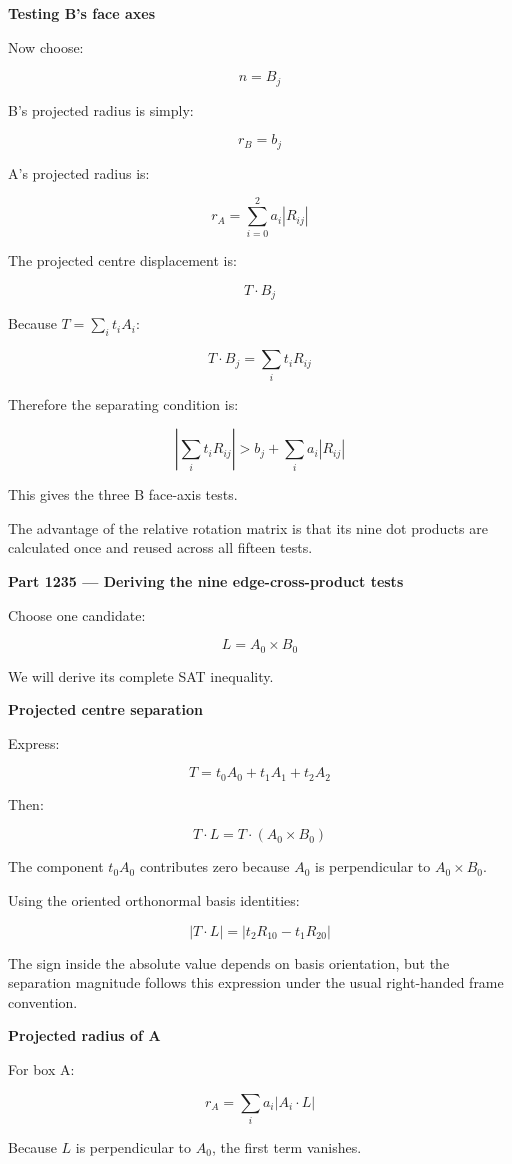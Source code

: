 \textbf{Testing B's face axes}

Now choose:

\[
n=B_j
\]

B's projected radius is simply:

\[
r_B=b_j
\]

A's projected radius is:

\[
r_A=\sum_{i=0}^2a_i|R_{ij}|
\]

The projected centre displacement is:

\[
T\cdot B_j
\]

Because \(T=\sum_i t_iA_i\):

\[
T\cdot B_j=\sum_i t_iR_{ij}
\]

Therefore the separating condition is:

\[
\boxed{ \left|\sum_i t_iR_{ij}\right| > b_j+\sum_i a_i|R_{ij}| }
\]

This gives the three B face-axis tests.

The advantage of the relative rotation matrix is that its nine dot products are calculated once and reused across all fifteen tests.

\textbf{Part 1235 --- Deriving the nine edge-cross-product tests}

Choose one candidate:

\[
\boxed{ L=A_0\times B_0 }
\]

We will derive its complete SAT inequality.

\textbf{Projected centre separation}

Express:

\[
T=t_0A_0+t_1A_1+t_2A_2
\]

Then:

\[
T\cdot L= T\cdot(A_0\times B_0)
\]

The component \(t_0A_0\) contributes zero because \(A_0\) is perpendicular to \(A_0\times B_0\).

Using the oriented orthonormal basis identities:

\[
\boxed{ |T\cdot L|= |t_2R_{10}-t_1R_{20}| }
\]

The sign inside the absolute value depends on basis orientation, but the separation magnitude follows this expression under the usual right-handed frame convention.

\textbf{Projected radius of A}

For box A:

\[
r_A= \sum_i a_i|A_i\cdot L|
\]

Because \(L\) is perpendicular to \(A_0\), the first term vanishes.

